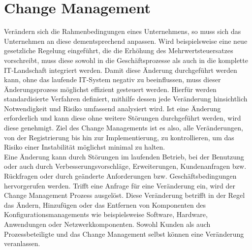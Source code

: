 \chapter{Change Management}
\vspace{-0.4cm}
Verändern sich die Rahmenbedingungen eines Unternehmens, so muss sich das Unternehmen an diese dementsprechend anpassen. Wird beispielsweise eine neue gesetzliche Regelung eingeführt, die die Erhöhung des Mehrwertsteuersatzes vorschreibt, muss diese sowohl in die Geschäftsprozesse als auch in die komplette IT-Landschaft integriert werden. Damit diese Änderung durchgeführt werden kann, ohne das laufende IT-System negativ zu beeinflussen, muss dieser Änderungsprozess möglichst effizient gesteuert werden. Hierfür werden standardisierte Verfahren definiert, mithilfe dessen jede Veränderung hinsichtlich Notwendigkeit und Risiko umfassend analysiert wird. Ist eine Änderung erforderlich und kann diese ohne weitere Störungen durchgeführt werden, wird diese genehmigt. Ziel des Change Managements ist es also, alle Veränderungen, von der Registrierung bis hin zur Implementierung, zu kontrollieren, um das Risiko einer Instabilität möglichst minimal zu halten.
\\
Eine Änderung kann durch Störungen im laufenden Betrieb, bei der Benutzung oder auch durch Verbesserungsvorschläge, Erweiterungen, Kundenanfragen bzw. Rückfragen oder durch geänderte Anforderungen bzw. Geschäftsbedingungen hervorgerufen werden. Trifft eine Anfrage für eine Veränderung ein, wird der Change Management Prozess ausgelöst. Diese Veränderung betrifft in der Regel das Ändern, Hinzufügen oder das Entfernen von Komponenten des Konfigurationsmanagements wie beispielsweise Software, Hardware, Anwendungen oder Netzwerkkomponenten. Sowohl Kunden als auch Prozessbeteiligte und das Change Management selbst können eine Veränderung veranlassen. 
\vspace{-0.1cm}
